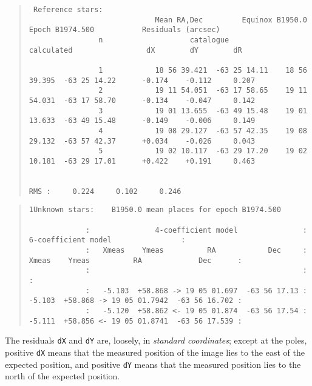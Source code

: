 \documentclass[twoside,11pt]{article}
\renewcommand{\_}{\texttt{\symbol{95}}}
\begin{document}
\begin{tiny}
\begin{quote}
\begin{verbatim}
 Reference stars:
                             Mean RA,Dec         Equinox B1950.0      Epoch B1974.500           Residuals (arcsec)
                n                    catalogue                     calculated                 dX        dY        dR

                1            18 56 39.421  -63 25 14.11    18 56 39.395  -63 25 14.22      -0.174    -0.112     0.207
                2            19 11 54.051  -63 17 58.65    19 11 54.031  -63 17 58.70      -0.134    -0.047     0.142
                3            19 01 13.655  -63 49 15.48    19 01 13.633  -63 49 15.48      -0.149    -0.006     0.149
                4            19 08 29.127  -63 57 42.35    19 08 29.132  -63 57 42.37      +0.034    -0.026     0.043
                5            19 02 10.117  -63 29 17.20    19 02 10.181  -63 29 17.01      +0.422    +0.191     0.463

                                                                                  RMS :     0.224     0.102     0.246
\end{verbatim}
\end{quote}

\vspace*{20mm}

\begin{quote}
\begin{verbatim}
1Unknown stars:    B1950.0 mean places for epoch B1974.500

             :               4-coefficient model               :                6-coefficient model                :
             :   Xmeas    Ymeas          RA            Dec     :   Xmeas    Ymeas          RA             Dec      :
             :                                                 :                                                   :
             :   -5.103  +58.868 -> 19 05 01.697  -63 56 17.13 :   -5.103  +58.868 -> 19 05 01.7942  -63 56 16.702 :
             :   -5.120  +58.862 <- 19 05 01.874  -63 56 17.54 :   -5.111  +58.856 <- 19 05 01.8741  -63 56 17.539 :
\end{verbatim}
\end{quote}
\end{tiny}

\vspace*{20mm}


The residuals \texttt{dX} and \texttt{dY} are, loosely, in
\textit{standard coordinates}; except at the poles, positive
\texttt{dX} means that the measured position of the image lies to the
east of the expected position, and positive \texttt{dY} means that the
measured position lies to the north of the expected position.
\end{document}
